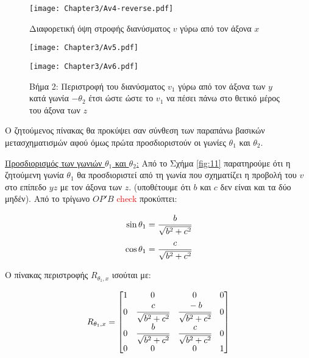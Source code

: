 \begin{solution}
\begin{figure}[h!]
	\begin{center}
		    \texttt{[image: Chapter3/Av4-reverse.pdf]}
	\end{center}
	\caption{Διαφορετική όψη στροφής διανύσματος $v$ γύρω από τον άξονα $x$}		
\end{figure}


\begin{figure}[h!]
	\begin{center}
		\begin{minipage}[b]{0.48\textwidth} %
		    \texttt{[image: Chapter3/Av5.pdf]}
		\end{minipage}%
	\hfill
		\begin{minipage}[b]{0.48\textwidth} %
		    \texttt{[image: Chapter3/Av6.pdf]}
		\end{minipage}
	\end{center}
	\caption{Βήμα 2: Περιστροφή του διανύσματος $v_1$ γύρω από τον άξονα των $y$ κατά γωνία $-\theta_2$ έτσι ώστε ώστε το $v_1$ να πέσει πάνω στο θετικό μέρος του άξονα των $z$}
\end{figure}

Ο ζητούμενος πίνακας θα προκύψει σαν σύνθεση των παραπάνω βασικών μετασχηματισμών αφού όμως πρώτα προσδιοριστούν οι γωνίες $\theta_1$ και $\theta_2$.

\underline{Προσδιορισμός των γωνιών $\theta_1$ και $\theta_2$:} Από το Σχήμα  \ref{fig:11} παρατηρούμε ότι η ζητούμενη γωνία $\theta_1$ θα προσδιοριστεί από τη γωνία που σχηματίζει η προβολή του $v$ στο επίπεδο $yz$ με τον άξονα των $z$. (υποθέτουμε ότι $b$ και $c$ δεν είναι και τα δύο μηδέν). Από το τρίγωνο $OP'B$ \textcolor{red}{check} προκύπτει:

\begin{align*}
	\sin{\theta_1} &= \cfrac{b}{\sqrt{b^2 + c^2}} \\
	\cos{\theta_1} &= \cfrac{c}{\sqrt{b^2 + c^2}}
\end{align*}


Ο πίνακας περιστροφής \(R_{\theta_1, x}\) ισούται με:

\[
R_{\theta_1, x} =
\begin{bmatrix}
1 & 0 & 0 & 0\\
0 & \cfrac{c}{\sqrt{b^2 + c^2}} & \cfrac{-b}{\sqrt{b^2 + c^2}} & 0\\
0 & \cfrac{b}{\sqrt{b^2 + c^2}} & \cfrac{c}{\sqrt{b^2 + c^2}} & 0 \\
0 & 0 & 0 & 1
\end{bmatrix}
\]


\end{solution}
